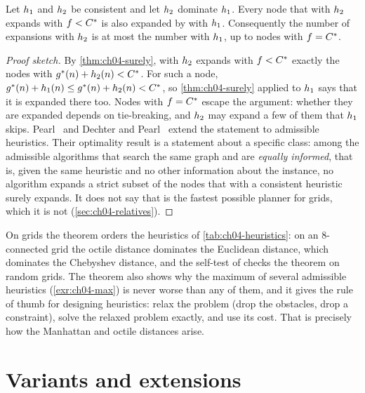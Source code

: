 \begin{theorem}
\label{thm:ch04-dominance}
Let $h_1$ and $h_2$ be consistent and let $h_2$ dominate
$h_1$. Every node that \astar with $h_2$ expands with
$f < C^*$ is also expanded by \astar with $h_1$. Consequently the
number of expansions with $h_2$ is at most the number with $h_1$, up
to nodes with $f = C^*$.
\end{theorem}
\begin{proof}[Proof sketch]
By \cref{thm:ch04-surely}, \astar with $h_2$ expands with $f < C^*$
exactly the nodes with $g^*(n) + h_2(n) < C^*$. For such a node,
$g^*(n) + h_1(n) \le g^*(n) + h_2(n) < C^*$, so
\cref{thm:ch04-surely} applied to $h_1$ says that it is expanded there
too. Nodes with $f = C^*$ escape the argument: whether they are expanded
depends on tie-breaking, and $h_2$ may expand a few of them that
$h_1$ skips. Pearl~\cite{pearl1984heuristics} and Dechter and
Pearl~\cite{dechter1985generalized} extend the statement to admissible
heuristics. Their optimality result is a statement about a specific class:
among the admissible algorithms that search the same graph and are
\emph{equally informed}, that is, given the same heuristic and no other
information about the instance, no algorithm expands a strict subset of the
nodes that \astar with a consistent heuristic surely expands. It does not say
that \astar is the fastest possible planner for grids, which it is not
(\cref{sec:ch04-relatives}).
\end{proof}

On grids the theorem orders the heuristics of \cref{tab:ch04-heuristics}: on
an 8-connected grid the octile distance dominates the Euclidean distance,
which dominates the Chebyshev distance, and the self-test of
 checks the theorem on random grids. The theorem also
shows why the maximum of several admissible heuristics
(\cref{exr:ch04-max}) is never worse than any of them, and it gives the rule of thumb for designing
heuristics: relax the problem (drop the obstacles, drop a constraint), solve
the relaxed problem exactly, and use its cost. That is precisely how the
Manhattan and octile distances arise.

\section{Variants and extensions}
\label{sec:ch04-variants}

